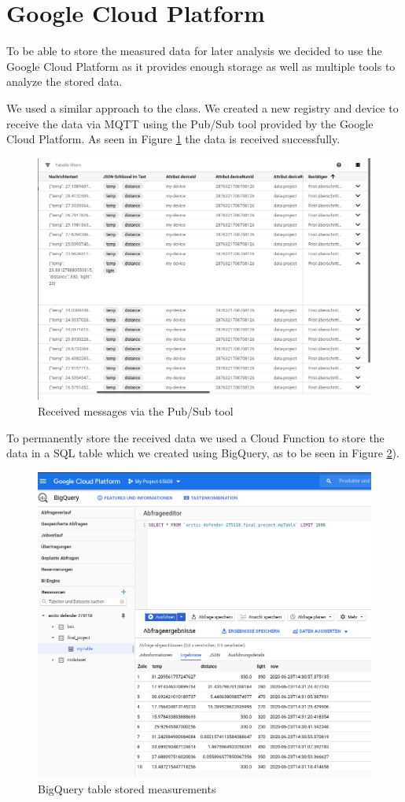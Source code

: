 \documentclass{article}
\begin{document}
\section{Google Cloud Platform}
To be able to store the measured data for later analysis we decided to use the Google Cloud Platform as it provides enough storage as well as multiple tools to analyze the stored data.\par
We used a similar approach to the class. We created a new registry and device to receive the data via MQTT using the Pub/Sub tool provided by the Google Cloud Platform. As seen in Figure \ref{pic:messages} the data is received successfully.\par
\begin{figure}
\centering
\includegraphics[scale=0.4]{messages.png}
\caption{Received messages via the Pub/Sub tool}
\label{pic:messages}
\end{figure}
To permanently store the received data we used a Cloud Function to store the data in a SQL table which we created using BigQuery, as to be seen in Figure \ref{fig:table}).
\begin{figure}
\centering
\includegraphics[scale=0.4]{table.png}
\caption{BigQuery table stored measurements}
\label{fig:table}
\end{figure}
\end{document}
